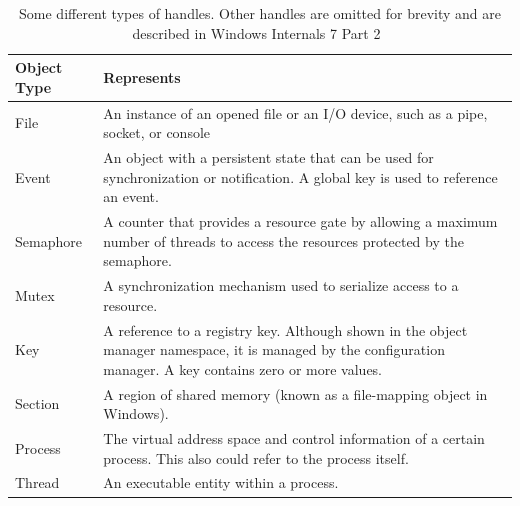 \documentclass[a4paper, 11pt, english]{report}
\begin{document}
\begin{table}[h]
\begin{tabular}{p{} p{} }
\hline
\textbf{Object Type} & \textbf{Represents} \\
\hline
File & An instance of an opened file or an I/O device, such as a pipe, socket, or console \\
Event & An object with a persistent state that can be used for synchronization or notification. A global key is used to reference an event. \\
Semaphore & A counter that provides a resource gate by allowing a maximum number of threads to access the resources protected by the semaphore.\\
Mutex & A synchronization mechanism used to serialize access to a resource. \\
Key & A reference to a registry key. Although shown in the object manager namespace, it is managed by the configuration manager. A key contains zero or more values. \\
Section & A region of shared memory (known as a file-mapping object in Windows).\\
Process & The virtual address space and control information of a certain process. This also could refer to the process itself.\\
Thread & An executable entity within a process.\\
\hline
\end{tabular}
\caption{Some different types of handles. Other handles are omitted for brevity and are described in Windows Internals 7 Part 2~\cite{windows-internals-2}}
\label{fig:handles}
\end{table}
\end{document}
